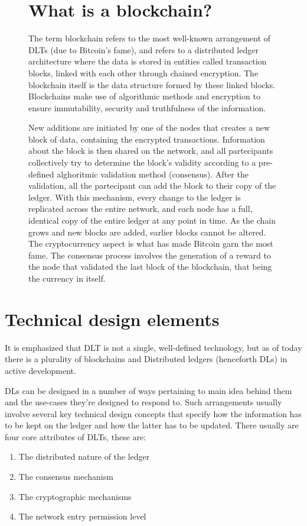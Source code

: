 \begin{figure}[h]
    \begin{tcolorbox}[colframe=boxcolor]
        \section*{What is a blockchain?}
        The term blockchain refers to the most well-known arrangement of DLTs (due to Bitcoin's fame), and refers to a distributed ledger architecture where the data is stored in entities called transaction blocks, linked with each other through chained encryption. The blockchain itself is the data structure formed by these linked blocks. Blockchains make use of algorithmic methods and encryption to ensure immutability, security and truthfulness of the information.
        
        New additions are initiated by one of the nodes that creates a new block of data, containing the encrypted transactions. Information about the block is then shared on the network, and all partecipants collectively try to determine the block's validity according to a pre-defined alghoritmic validation method (consensus). After the validation, all the partecipant can add the block to their copy of the ledger. With this mechanism, every change to the ledger is replicated across the entire network, and each node has a full, identical copy of the entire ledger at any point in time. As the chain grows and new blocks are added, earlier blocks cannot be altered. \\

        The cryptocurrency aspect is what has made Bitcoin garn the most fame. The consensus process involves the generation of a reward to the node that validated the last block of the blockchain, that being the currency in itself.
    \end{tcolorbox}
\end{figure}
\newpage

\section{Technical design elements}

It is emphasized that DLT is not a single, well-defined technology, but as of today there is a plurality of blockchains and Distributed ledgers (henceforth DLs) in active development.

DLs can be designed in a number of ways pertaining to main idea behind them and the use-cases they're designed to respond to. Such arrangements usually involve several key technical design concepts that specify how the information has to be kept on the ledger and how the latter has to be updated. 
There usually are four core attributes of DLTs, these are:
\begin{enumerate}
    \item The distributed nature of the ledger
    \item The consensus mechanism
    \item The cryptographic mechanisms
    \item The network entry permission level
\end{enumerate}

